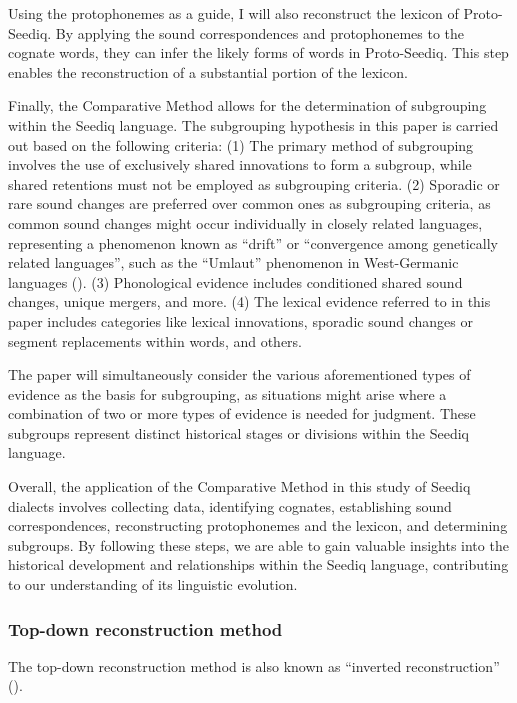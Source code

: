 \documentclass[12pt]{article}
\newcommand{\psedf}{Proto-Seediq\xspace}
\begin{document}
Using the protophonemes as a guide, I will also reconstruct the lexicon of \psedf. By applying the sound correspondences and protophonemes to the cognate words, they can infer the likely forms of words in \psedf. This step enables the reconstruction of a substantial portion of the lexicon.

Finally, the Comparative Method allows for the determination of subgrouping within the Seediq language. The subgrouping hypothesis in this paper is carried out based on the following criteria: (1) The primary method of subgrouping involves the use of exclusively shared innovations to form a subgroup, while shared retentions must not be employed as subgrouping criteria. (2) Sporadic or rare sound changes are preferred over common ones as subgrouping criteria, as common sound changes might occur individually in closely related languages, representing a phenomenon known as ``drift'' or ``convergence among genetically related languages'', such as the ``Umlaut'' phenomenon in West-Germanic languages (\cite[47--48]{greenberg1957subgroupings}). (3) Phonological evidence includes conditioned shared sound changes, unique mergers, and more. (4) The lexical evidence referred to in this paper includes categories like lexical innovations, sporadic sound changes or segment replacements within words, and others. 

The paper will simultaneously consider the various aforementioned types of evidence as the basis for subgrouping, as situations might arise where a combination of two or more types of evidence is needed for judgment. These subgroups represent distinct historical stages or divisions within the Seediq language.

Overall, the application of the Comparative Method in this study of Seediq dialects involves collecting data, identifying cognates, establishing sound correspondences, reconstructing protophonemes and the lexicon, and determining subgroups. By following these steps, we are able to gain valuable insights into the historical development and relationships within the Seediq language, contributing to our understanding of its linguistic evolution.

\subsubsection{Top-down reconstruction method}

The top-down reconstruction method is also known as ``inverted reconstruction'' (\cites[512--16]{hockett1958course}[346]{anttila1972introduction}). 
\end{document}
